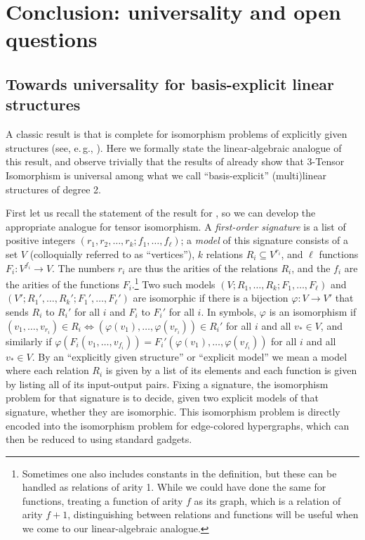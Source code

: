 \documentclass[11pt]{article}
\begin{document}
\section{Conclusion: universality and open questions} \label{sec:conclusion}

\subsection{Towards universality for basis-explicit linear structures} \label{sec:universality}
A classic result is that \GI is complete for isomorphism problems of explicitly given structures (see, e.\,g., \cite[Section~15]{ZKT}). Here we formally state the linear-algebraic analogue of this result, and observe trivially that the results of \cite{FGS19} already show that 3-Tensor Isomorphism is universal among what we call ``basis-explicit'' (multi)linear structures of degree 2.

First let us recall the statement of the result for \GI, so we can develop the 
appropriate analogue for tensor isomorphism. A \emph{first-order signature} is a 
list of positive integers $(r_1, r_2, \dotsc, r_k; f_1, \dotsc, f_\ell)$; a 
\emph{model} of this signature consists of a set $V$ (colloquially referred to as 
``vertices''), $k$ relations $R_i\subseteq V^{r_i}$, 
and $\ell$ functions $F_i \colon V^{f_i} 
\to V$. The numbers $r_i$ are thus the arities of the relations $R_i$, and the 
$f_i$ are the arities of the functions $F_i$.\footnote{Sometimes one also includes 
constants in the definition, but these can be handled as relations of arity 1. 
While we could have done the same for functions, treating a function of arity $f$ 
as its graph, which is a relation of arity $f+1$, distinguishing between relations 
and functions will be useful when we come to our linear-algebraic analogue.}
Two such models $(V; R_1, \dotsc, R_k; F_1, \dotsc, F_\ell)$ and $(V'; R_1', \dotsc, R_k'; F_1', \dotsc, F_\ell')$ are isomorphic if there is a bijection $\varphi\colon V \to V'$ that sends $R_i$ to $R_i'$ for all $i$ and $F_i$ to $F_i'$ for all $i$. In symbols, $\varphi$ is an isomorphism if $(v_1, \dotsc, v_{r_i}) \in R_i \Leftrightarrow (\varphi(v_1), \dotsc, \varphi(v_{r_i})) \in R_i'$ for all $i$ and all $v_* \in V$, and similarly if $\varphi(F_i(v_1, \dotsc, v_{f_i})) = F_i'(\varphi(v_1), \dotsc, \varphi(v_{f_i}))$ for all $i$ and all $v_* \in V$. By an ``explicitly given structure'' or ``explicit model'' we mean a model where each relation $R_i$ is given by a list of its elements and each function is given by listing all of its input-output pairs. Fixing a signature, the isomorphism problem for that signature is to decide, given two explicit models of that signature, whether they are isomorphic. This isomorphism problem is directly encoded into the isomorphism problem for edge-colored hypergraphs, which can then be reduced to \GI using standard gadgets.
\end{document}
